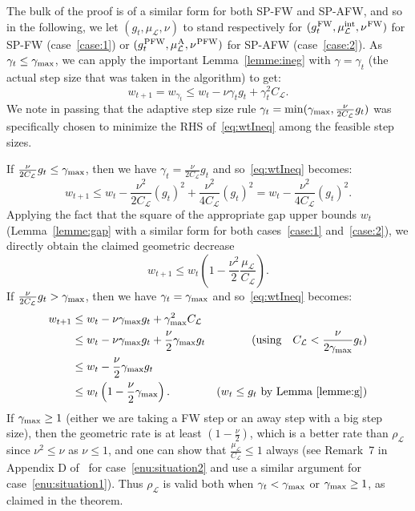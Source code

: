 \documentclass[twoside]{article}
\renewcommand{\L}{\mathcal{L}}
\newcommand{\wt}{w_t}
\newcommand{\wtt}{w_{t+1}}
\newcommand{\gap}{g_{t}}
\newcommand{\CondNumb}{\nu}
\newcommand{\stepsize}{\gamma}
\newcommand{\stepmax}{\stepsize_{\textnormal{\scriptsize max}}} %
\newcommand{\FW}{{\hspace{0.05em}\textnormal{FW}}}
\newcommand{\PW}{{\hspace{0.05em}\textnormal{PFW}}}
\newcommand{\away}{{\hspace{0.05em}\textnormal{A}}}
\newcommand{\muIntL}{\mu^{\text{int}}_\L} %
\newcommand{\0}{\mathbf{0}} %
\begin{document}
  \proof 
  The bulk of the proof is of a similar form for both SP-FW and SP-AFW, and so in the following, we let $(\gap, \mu_\L, \CondNumb)$ to stand respectively for $(\gap^{\FW},\muIntL,\CondNumb^{\FW})$ for SP-FW (case~\eqref{case:1}) or $(\gap^{\PW},\mu^{\away}_\L,\CondNumb^{\PW})$ for SP-AFW (case~\eqref{case:2}). As $\stepsize_t \leq \stepmax$, we can apply the important Lemma~\ref{lemme:ineg} with $\stepsize = \stepsize_t$ (the actual step size that was taken in the algorithm) to get:
  \begin{equation} \label{eq:wtIneq}
  w_{t+1} = w_{\stepsize_t}  
         \leq \wt  
        - \CondNumb \stepsize_t \gap
        + \gamma_t^2 {C_\L} . 
  \end{equation}
  We note in passing that the adaptive step size rule $\stepsize_t = \min(\stepmax, \frac{\CondNumb}{2 C_\L}\gap)$ was specifically chosen to minimize the RHS of~\eqref{eq:wtIneq} among the feasible step sizes. 
  
  If $\frac\CondNumb{2C_\L}\gap\leq \stepmax$, then we have $\gamma_t = \frac\CondNumb{2C_\L}\gap$ and so~\eqref{eq:wtIneq} becomes:
      \begin{equation}
        \wtt \leq \wt - \frac{\CondNumb^2}{ 2C_\L}  (\gap)^2+ \frac{\CondNumb^2}{ 4C_\L}(\gap)^2 = \wt - \frac{\CondNumb^2}{4C_\L} (\gap)^2.
      \end{equation}
    Applying the fact that the square of the appropriate gap upper bounds $w_t$ (Lemma~\ref{lemme:gap} with a similar form for both cases~\eqref{case:1} and~\eqref{case:2}), we directly obtain the claimed geometric decrease
      \begin{equation}
        \wtt \leq \wt \left(1- \frac{\CondNumb^2}{2} \frac{\mu_\L}{C_\L} \right).
      \end{equation}
    If $ \frac\CondNumb{2 C_\L}\gap> \stepmax$, then we have $\gamma_t = \stepmax$ and so~\eqref{eq:wtIneq} becomes:
    \begin{align}
      \wtt 
      &\leq  \wt - \CondNumb \stepmax \gap + \stepmax^2 C_\L & \notag\\
      & \leq \wt - \CondNumb \stepmax \gap + \frac\CondNumb{2} \stepmax \gap &( \text{using}\quad  C_\L < \frac{\CondNumb}{2 \stepmax}\gap) \\
      & \leq \wt - \frac\CondNumb{2} \stepmax \gap &\notag\\
       & \leq \wt \left(1-\frac{\CondNumb}{2}\stepmax\right).& (w_t \leq g_t \text{ by Lemma \ref{lemme:g}})
%
%
    \end{align}
    If $\stepmax \geq 1$ (either we are taking a FW step or an away step with a big step size), then the geometric rate is at least $(1-\frac{\CondNumb}{2})$, which is a better rate than $\rho_\L$ since $\CondNumb^2 \leq \CondNumb$ as $\CondNumb \leq 1$, and one can show that $\frac{\mu_\L}{C_\L} \leq 1$ always (see Remark~7 in Appendix D of~\citep{lacoste2015global} for case~\eqref{enu:situation2} and use a similar argument for case~\eqref{enu:situation1}). Thus $\rho_\L$ is valid both when $\stepsize_t < \stepmax$ or $\stepmax \geq 1$, as claimed in the theorem.
    
\end{document}
